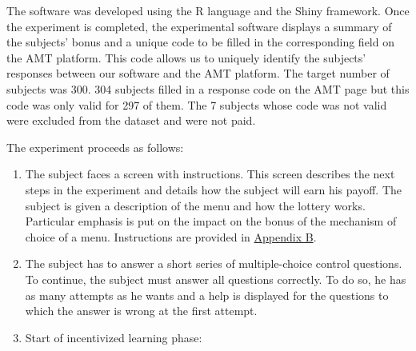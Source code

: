 \documentclass[
]{book}
\begin{document}
The software was developed using the R language and the Shiny framework.
Once the experiment is completed, the experimental software displays a summary
of the subjects' bonus and a unique code to be filled in the corresponding field
on the AMT platform.
This code allows us to uniquely identify the subjects' responses between our
software and the AMT platform.
The target number of subjects was 300.
304 subjects filled in a response code on the AMT page but this code was only
valid for 297 of them.
The 7 subjects whose code was not valid were excluded from the dataset and were
not paid.

The experiment proceeds
as follows:

\begin{enumerate}
\def\labelenumi{\arabic{enumi}.}
\item
  The subject faces a screen with instructions.
  This screen describes the next steps in the experiment and details how the
  subject will earn his payoff.
  The subject is given a description of the menu and how the lottery works.
  Particular emphasis is put on the impact on the bonus of the mechanism of choice
  of a menu.
  Instructions are provided in \protect\hyperlink{expe-instruc3}{Appendix B}.
\item
  The subject has to answer a short series of multiple-choice control questions.
  To continue, the subject must answer all questions correctly.
  To do so, he has as many attempts as he wants and a help is displayed for the
  questions to which the answer is wrong at the first attempt.
\item
  Start of incentivized learning phase:


\end{enumerate}
\end{document}
